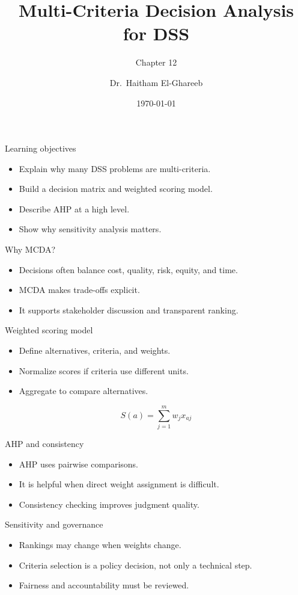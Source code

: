 \documentclass[aspectratio=169,11pt]{beamer}
\title[MCDA]{Multi-Criteria Decision Analysis for DSS}
\subtitle{Chapter 12}
\author{Dr.\ Haitham El-Ghareeb}
\institute{Faculty of Computers and Information Sciences}
\date{\today}
\begin{document}
\begin{frame}
  \titlepage
\end{frame}

\begin{frame}{Learning objectives}
  \begin{itemize}
    \item Explain why many DSS problems are multi-criteria.
    \item Build a decision matrix and weighted scoring model.
    \item Describe AHP at a high level.
    \item Show why sensitivity analysis matters.
  \end{itemize}
\end{frame}

\begin{frame}{Why MCDA?}
  \begin{itemize}
    \item Decisions often balance cost, quality, risk, equity, and time.
    \item MCDA makes trade-offs explicit.
    \item It supports stakeholder discussion and transparent ranking.
  \end{itemize}
\end{frame}

\begin{frame}{Weighted scoring model}
  \begin{itemize}
    \item Define alternatives, criteria, and weights.
    \item Normalize scores if criteria use different units.
    \item Aggregate to compare alternatives.
  \end{itemize}
  \[
    S(a)=\sum_{j=1}^{m} w_j x_{aj}
  \]
\end{frame}

\begin{frame}{AHP and consistency}
  \begin{itemize}
    \item AHP uses pairwise comparisons.
    \item It is helpful when direct weight assignment is difficult.
    \item Consistency checking improves judgment quality.
  \end{itemize}
\end{frame}

\begin{frame}{Sensitivity and governance}
  \begin{itemize}
    \item Rankings may change when weights change.
    \item Criteria selection is a policy decision, not only a technical step.
    \item Fairness and accountability must be reviewed.
  \end{itemize}
\end{frame}
\end{document}
